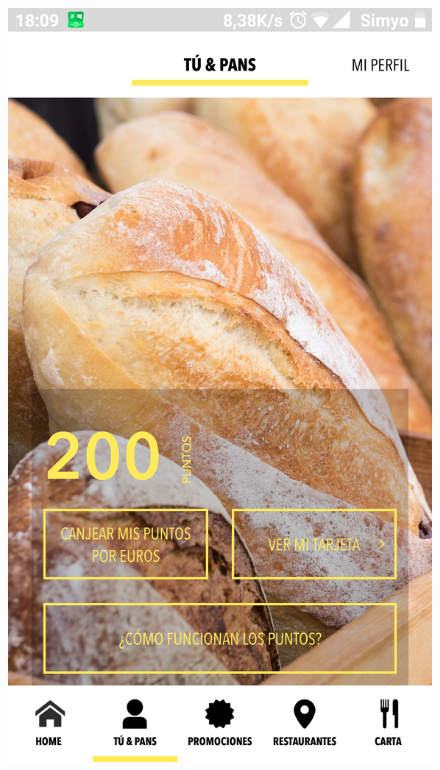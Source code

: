 \documentclass[twoside]{report}
\begin{document}
\begin{figure}[H]
\begin{center}
\includegraphics[scale=0.10]{images/restaurantes/pans1.png}

\end{center}
\end{figure}
\end{document}
